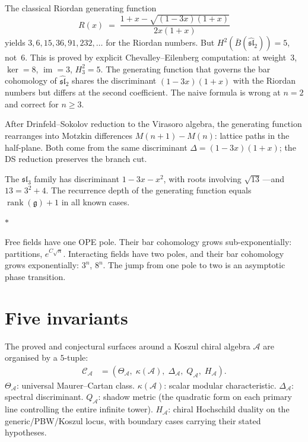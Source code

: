\documentclass[11pt]{article}
\newcommand{\cA}{\mathcal{A}}
\newcommand{\cC}{\mathcal{C}}
\newcommand{\fg}{\mathfrak{g}}
\newcommand{\fsl}{\mathfrak{sl}}
\newcommand{\B}{\bar{B}}
\newcommand{\sep}{\bigskip\begin{center}$*$\end{center}\medskip}
\begin{document}
\begin{warning}\label{warn:riordan-h2}
The classical Riordan generating function
\[
R(x) \;=\; \frac{1 + x - \sqrt{(1-3x)(1+x)}}{2x(1+x)}
\]
yields $3, 6, 15, 36, 91, 232, \ldots$ for the Riordan numbers.
But $H^2(\B(\widehat{\fsl}_2)) = 5$, not~$6$.  This is proved
by explicit Chevalley--Eilenberg computation: at weight~$3$,
$\ker = 8$, $\operatorname{im} = 3$, $H^2_3 = 5$.  The generating
function that governs the bar cohomology of $\widehat{\fsl}_2$
shares the discriminant $(1-3x)(1+x)$ with the Riordan numbers
but differs at the second coefficient.  The naive formula is
wrong at $n = 2$ and correct for $n \geq 3$.
\end{warning}

After Drinfeld--Sokolov reduction to the Virasoro algebra, the
generating function rearranges into Motzkin differences
$M(n{+}1) - M(n)$: lattice paths in the half-plane.  Both come
from the same discriminant $\Delta = (1-3x)(1+x)$; the DS
reduction preserves the branch cut.

The $\fsl_3$ family has discriminant $1 - 3x - x^2$, with
roots involving $\sqrt{13}$\,---and $13 = 3^2 + 4$.  The
recurrence depth of the generating function equals
$\operatorname{rank}(\fg) + 1$ in all known cases.

\sep

Free fields have one OPE pole.  Their bar cohomology grows
sub-exponentially: partitions, $e^{C\sqrt{n}}$.  Interacting
fields have two poles, and their bar cohomology grows
exponentially: $3^n$, $8^n$.  The jump from one pole to two
is an asymptotic phase transition.


\section{Five invariants}
\label{sec:five}

The proved and conjectural surfaces around a Koszul chiral algebra
$\cA$ are organised by a $5$-tuple:
\begin{align*}
\cC_\cA &= (\Theta_\cA,\;\kappa(\cA),\;\Delta_\cA,\;
Q_\cA,\;H_\cA).
\end{align*}
$\Theta_\cA$: universal Maurer--Cartan class.
$\kappa(\cA)$: scalar modular characteristic.
$\Delta_\cA$: spectral discriminant.
$Q_\cA$: shadow metric (the quadratic form on each primary line
controlling the entire infinite tower).
$H_\cA$: chiral Hochschild duality on the generic/PBW/Koszul
locus, with boundary cases carrying their stated hypotheses.
\end{document}
